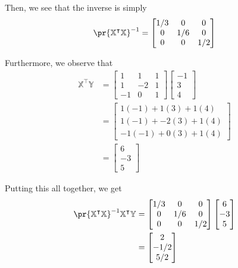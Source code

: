 \documentclass{article}
\begin{document}
\begin{solution}
	Then, we see that the inverse is simply
	\begin{equation*}
		\pr{\mathbb X^{\intercal} \mathbb X}^{-1} = \begin{bmatrix}
			1/3 & 0 & 0 \\ 0 & 1/6 & 0 \\ 0 & 0 & 1/2
		\end{bmatrix}
	\end{equation*}

	Furthermore, we observe that
	\begin{align*}
		\mathbb X^{\intercal}\mathbb Y &=  \begin{bmatrix}
			1 & 1 & 1\\
			1 & -2 & 1 \\
			-1 & 0 & 1
		\end{bmatrix}\begin{bmatrix}
		-1 \\ 3 \\ 4
	\end{bmatrix} \\
	&= \begin{bmatrix}
		1(-1) + 1(3) + 1(4) \\
		1(-1) + -2(3) + 1(4) \\
		-1(-1) + 0(3) + 1(4)
	\end{bmatrix} \\
	&= \begin{bmatrix}
		6 \\
		-3 \\
		5
	\end{bmatrix}
	\end{align*}

	Putting this all together, we get
	\begin{align*}
		\pr{\mathbb X^{\intercal} \mathbb X}^{-1}	\mathbb X^{\intercal}\mathbb Y  &=  \begin{bmatrix}
			1/3 & 0 & 0 \\ 0 & 1/6 & 0 \\ 0 & 0 & 1/2
		\end{bmatrix}\begin{bmatrix}
			6 \\
			-3 \\
			5
		\end{bmatrix} \\
		&= \begin{bmatrix}
			2 \\
			-1/2 \\
			5/2
		\end{bmatrix}
	\end{align*}
\end{solution}
\end{document}
